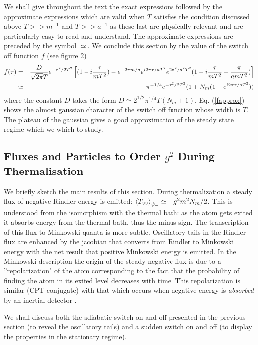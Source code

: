 \documentclass[12pt]{article}
\begin{document}
We shall give throughout the text the exact expressions followed
by the approximate  expressions which are valid when $T$
satisfies the condition discussed above $T>> m^{-1}$ and $T>> a^{-1}$
as these
last are physically relevant  and are particularly easy to read and understand.
The approximate expressions are preceded by the symbol $\simeq$.
We conclude this section by the value of the switch off function $f$
(see figure 2)
\begin{eqnarray}
f(\tau) &=&
{D \over \sqrt{2 \pi} T} e^{-\tau^2/2 T^2} \left[
(1 - i {\tau \over mT^2})
- e^{- 2 \pi m/ a} e^{i 2 \pi \tau / a T^2} e^{2 \pi^2 / a^2 T^2}
(1 - i {\tau \over mT^2} - {\pi \over a m T^2})\right]
\nonumber\\
&\simeq &\pi^{-1/4}  e^{-\tau^2/2 T^2}
( 1+ N_m(1 - e^{i 2 \pi \tau / a T^2}))
\label{fapprox}
\end{eqnarray}
where the constant $D$ takes the form $ D \simeq
 2^{1/2}\pi^{1/4} T (N_m + 1)$.
Eq. (\ref{fapprox}) shows the almost gaussian character of the switch off
function whose width is $T$.
The plateau of the gaussian gives a good approximation of the steady state
regime which we which to study.

\subsection{Fluxes and Particles to Order $g^2$ During Thermalisation}

We briefly sketch the main results of this section.
During thermalization a
steady flux of negative Rindler energy is emitted:
  $\mbox{$ \langle  T_{vv} \rangle $}_{\psi_-} \simeq - g^2 m^2
N_m /2$. This is understood from the isomorphism \cite{Grove}
 with the thermal bath: as the
atom gets exited it absorbs energy from the thermal bath, thus the minus sign.
The transcription of this flux to Minkowski quanta is more subtle. Oscillatory
tails in the Rindler flux are enhanced by the jacobian that converts from
Rindler to Minkowski energy with the net result that positive Minkowski energy
is emitted.
In the Minkowski description the origin of
the steady negative flux is due to a ''repolarization"
of the atom corresponding to
the fact that the probability of finding the atom in its exited level
decreases with time. This repolarization is similar (CPT conjugate)
 with that which occurs
when negative energy is {\it absorbed} by an inertial detector \cite{Grove2}.

We shall discuss both the adiabatic switch on and off presented in
the previous section (to reveal the oscillatory tails)
 and  a sudden switch on and off (to display the properties in the
stationary
regime).
\end{document}

